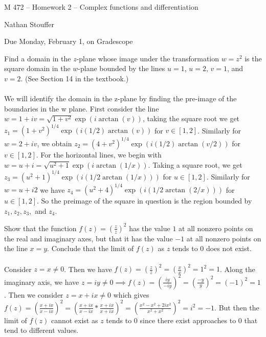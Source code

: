 \documentclass[11pt]{exam}
\newcommand{\ds}{\displaystyle}
\begin{document}
\centerline{\Large M 472 -- Homework 2 -- Complex functions and differentiation}
\vspace{1ex}
\centerline{Nathan Stouffer}
\vspace{2ex}
\centerline{Due Monday, February 1, on Gradescope}
\vspace{3ex}
\thispagestyle{empty}
\begin{questions}
\question Find a domain in the $z$-plane whose image under the
transformation $w=z^2$ is the square domain in the $w$-plane
bounded by the lines $u=1$, $u=2$, $v=1$, and $v=2$. (See
Section 14 in the textbook.) \\\\
We will identify the domain in the z-plane by finding the pre-image of the boundaries in the w plane.
First consider the line $w = 1 + iv = \sqrt{1 + v^2} \exp (i \arctan (v))$, taking the square root we get $z_1 = (1 + v^2)^{1/4} \exp (i (1/2) \arctan (v))$ for $v \in [1, 2]$.
Similarly for $w = 2 + i v$, we obtain $z_2 = (4 + v^2)^{1/4} \exp (i (1/2) \arctan (v/2))$ for $v \in [1,2]$.
For the horizontal lines, we begin with $w = u + i = \sqrt{u^2 + 1} \exp (i \arctan(1/x))$.
Taking a square root, we get $z_3 = (u^2 + 1)^{1/4} \exp (i (1/2 \arctan (1/x)))$ for $u \in [1,2]$.
Similarly for $w = u + i2$ we have $z_4 = (u^2 + 4)^{1/4} \exp (i (1/2 \arctan (2/x)))$ for $u \in [1,2]$.
So the preimage of the square in question is the region bounded by $z_1, z_2, z_3,$ and $z_4$.

\question Show that the function $\ds f(z) = \left( \frac{z}
{\bar{z}} \right)^2$ has the value $1$ at all nonzero points on
the real and imaginary axes, but that it has the value $-1$
at all nonzero points on the line $x=y$. Conclude that the
limit of $f(z)$ as $z$ tends to $0$ does not exist. \\\\
Consider $z = x \neq 0$.
Then we have $f(z) = \left( \frac{z}{\bar{z}} \right) ^2 = \left( \frac{x}{x} \right) ^2 = 1^2 = 1$.
Along the imaginary axis, we have $z = iy \neq 0 \implies f(z) = \left( \frac{iy}{-iy} \right) ^2 = \left( \frac{-y}{y} \right) ^2 = (-1)^2 = 1$.
Then we consider $z = x + ix \neq 0$ which gives $f(z) = \left( \frac{x + ix}{x - ix} \right) ^2 = \left( \frac{x + ix}{x - ix} * \frac{x+ix}{x+ix} \right) ^2 = \left( \frac{x^2 - x^2 + 2ix^2}{x^2 + x^2} \right) ^2 = i^2 = -1$.
But then the limit of $f(z)$ cannot exist as $z$ tends to 0 since there exist approaches to 0 that tend to different values.


\end{questions}
\end{document}
